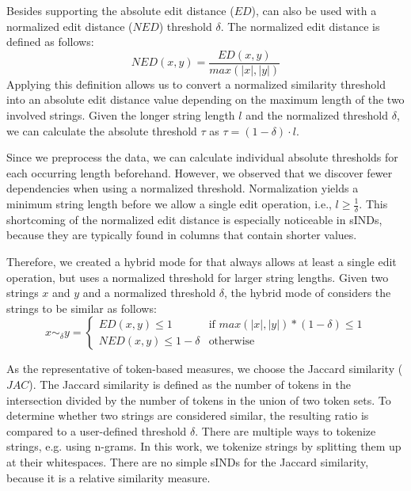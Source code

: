 
Besides supporting the absolute edit distance ($ED$), \sawfish can also be used with a normalized edit distance ($NED$) threshold $\delta$.
The normalized edit distance is defined as follows:
\begin{equation*}
    NED(x, y) = \frac{ED(x, y)}{max(|x|, |y|)}
\end{equation*}
Applying this definition allows us to convert a normalized similarity threshold into an absolute edit distance value depending on the maximum length of the two involved strings.
Given the longer string length $l$ and the normalized threshold $\delta$, we can calculate the absolute threshold $\tau$ as $\tau = (1 - \delta) \cdot l$.

Since we preprocess the data, we can calculate individual absolute thresholds for each occurring length beforehand.
However, we observed that we discover fewer dependencies when using a normalized threshold.
Normalization yields a minimum string length before we allow a single edit operation, i.e., $l \geq \frac{1}{\delta}$.
This shortcoming of the normalized edit distance is especially noticeable in sINDs, because they are typically found in columns that contain shorter values.

Therefore, we created a hybrid mode for \sawfish that always allows at least a single edit operation, but uses a normalized threshold for larger string lengths.
Given two strings $x$ and $y$ and a normalized threshold $\delta$, the hybrid mode of \sawfish considers the strings to be similar as follows:
\begin{equation*}
    x \sim_\delta y = 
    \begin{cases}
        ED(x, y) \leq 1 & \text{if } max(|x|, |y|) * (1 - \delta) \leq 1 \\
        NED(x, y) \leq 1 - \delta & \text{otherwise}
    \end{cases}
\end{equation*}

As the representative of token-based measures, we choose the Jaccard similarity ($JAC$).
The Jaccard similarity is defined as the number of tokens in the intersection divided by the number of tokens in the union of two token sets.
To determine whether two strings are considered similar, the resulting ratio is compared to a user-defined threshold $\delta$.
There are multiple ways to tokenize strings, e.g. using n-grams.
In this work, we tokenize strings by splitting them up at their whitespaces.
There are no simple sINDs for the Jaccard similarity, because it is a relative similarity measure.

